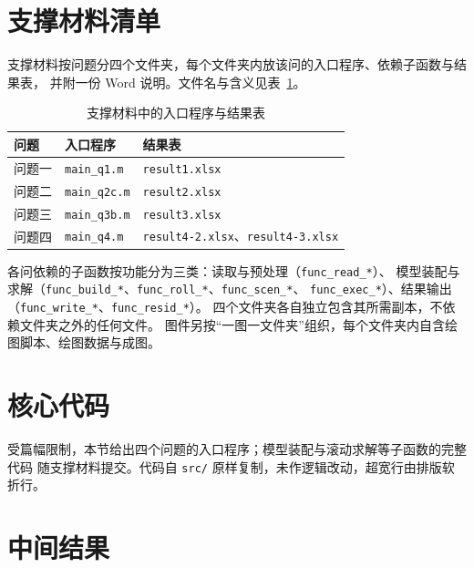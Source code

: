 %
\section{支撑材料清单}

支撑材料按问题分四个文件夹，每个文件夹内放该问的入口程序、依赖子函数与结果表，
并附一份 Word 说明。文件名与含义见表~\ref{tab:a-files}。

\begin{table}[H]
\centering
{}
\begin{tabular}{lll}
\toprule
问题 & 入口程序 & 结果表 \\
\midrule
问题一 & \texttt{main\_q1.m} & \texttt{result1.xlsx} \\
问题二 & \texttt{main\_q2c.m} & \texttt{result2.xlsx} \\
问题三 & \texttt{main\_q3b.m} & \texttt{result3.xlsx} \\
问题四 & \texttt{main\_q4.m} & \texttt{result4-2.xlsx}、\texttt{result4-3.xlsx} \\
\bottomrule
\end{tabular}
\caption{支撑材料中的入口程序与结果表}
\label{tab:a-files}
\end{table}

各问依赖的子函数按功能分为三类：读取与预处理（\texttt{func\_read\_*}）、
模型装配与求解（\texttt{func\_build\_*}、\texttt{func\_roll\_*}、\texttt{func\_scen\_*}、
\texttt{func\_exec\_*}）、结果输出（\texttt{func\_write\_*}、\texttt{func\_resid\_*}）。
四个文件夹各自独立包含其所需副本，不依赖文件夹之外的任何文件。
图件另按“一图一文件夹”组织，每个文件夹内自含绘图脚本、绘图数据与成图。

\section{核心代码}

受篇幅限制，本节给出四个问题的入口程序；模型装配与滚动求解等子函数的完整代码
随支撑材料提交。代码自 \texttt{src/} 原样复制，未作逻辑改动，超宽行由排版软折行。



\section{中间结果}

